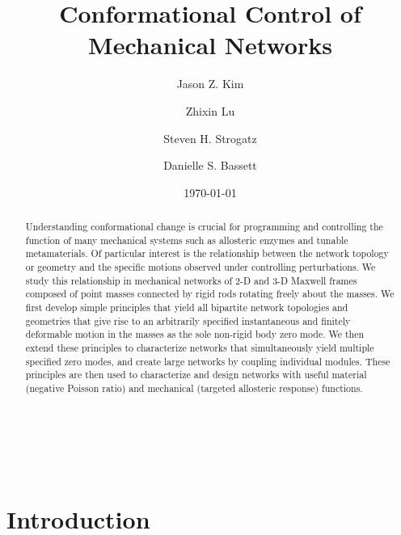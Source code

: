 \documentclass[%
preprint,
 amsmath,amssymb,
 aps,
]{revtex4-1}
\begin{document}




\title{Conformational Control of Mechanical Networks}
\author{Jason Z. Kim}
\author{Zhixin Lu}
\author{Steven H. Strogatz}
\author{Danielle S. Bassett}
\date{\today}
~\\
~\\
\begin{abstract}
Understanding conformational change is crucial for programming and controlling the function of many mechanical systems such as allosteric enzymes and tunable metamaterials. Of particular interest is the relationship between the network topology or geometry and the specific motions observed under controlling perturbations. We study this relationship in mechanical networks of 2-D and 3-D Maxwell frames composed of point masses connected by rigid rods rotating freely about the masses. We first develop simple principles that yield all bipartite network topologies and geometries that give rise to an arbitrarily specified instantaneous and finitely deformable motion in the masses as the sole non-rigid body zero mode. We then extend these principles to characterize networks that simultaneously yield multiple specified zero modes, and create large networks by coupling individual modules. These principles are then used to characterize and design networks with useful material (negative Poisson ratio) and mechanical (targeted allosteric response) functions.
\end{abstract}

\maketitle



\section{Introduction}
\end{document}
